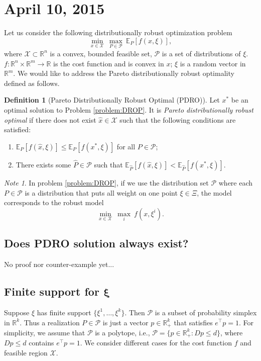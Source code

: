 \documentclass[10pt]{article}
\theoremstyle{plain}
\theoremstyle{definition}
\newtheorem{definition}{Definition}
\theoremstyle{remark}
\newtheorem*{note}{Note}
\newcommand{\mcal}{\mathcal}
\newcommand{\tr}{^{\top}}
\newcommand{\R}{\mathbb{R}}
\begin{document}
\newpage
\section*{April 10, 2015}
Let us consider the following distributionally robust optimization problem
\begin{equation}\label{problem:DROP}
\min_{x\in \mcal{X}}~\max_{P\in \mcal{P}}~\mathbb{E}_{P}[f(x,\xi)],\tag{DROP}
\end{equation}
where $\mcal{X}\subset \R^n$ is a convex, bounded feasible set, $\mcal{P}$ is a set of distributions of $\xi$. $f: \R^n\times \R^m\to \R$ is the cost function and
is convex in $x$; $\xi$ is a random vector in $\R^m$.
We would like to address the Pareto distributionally robust optimality defined as follows.
\begin{definition}[Pareto Distributionally Robust Optimal (PDRO)]
	Let $x^*$ be an optimal solution to Problem \eqref{problem:DROP}.
	It is \emph{Pareto distributionally robust optimal} if there does not exist
	$\hat{x}\in \mcal{X}$ such that the following
	conditions are satisfied:
	\begin{enumerate}[topsep=0pt,noitemsep,label=(\roman*)]
		\item $\mathbb{E}_P[f(\hat{x},\xi)] \le \mathbb{E}_P[f(x^*,\xi)]$ for all $P\in \mcal{P}$;
		\item There exists some $\hat{P}\in\mcal{P}$ such that
		$\mathbb{E}_{\hat{P}}[f(\hat{x},\xi)] < \mathbb{E}_{\hat{P}}[f(x^*,\xi)]$.
	\end{enumerate}
\end{definition}

{\color{blue}
\begin{note}
In problem \eqref{problem:DROP}, if we use the distribution set $\mcal{P}$ where
each $P\in \mcal{P}$ is a distribution that puts all weight on one point $\xi\in \Xi$, the model corresponds to the robust model
\[\min_{x\in \mcal{X}}~\max_{i}~f(x,\xi^i).\]
\end{note}
}

\subsection*{Does PDRO solution always exist?}
No proof nor counter-example yet... 


\subsection*{Finite support for $\boldsymbol\xi$}
Suppose $\xi$ has finite support $\{\xi^1,\dots, \xi^k\}$. Then $\mcal{P}$ is
a subset of probability simplex in $\R^k$. Thus a realization $P\in \mcal{P}$ is
just a vector $p\in \R^k_+$ that satisfies $e\tr p = 1$. For simplicity, we assume that $\mcal{P}$ is a polytope, i.e.,
$\mcal{P} = \{p\in \R^k_+: Dp\le d\}$, where $Dp\le d$ contains $e\tr p = 1$.  
We consider different cases for the cost function $f$ and feasible region $\mcal{X}$.
\end{document}
